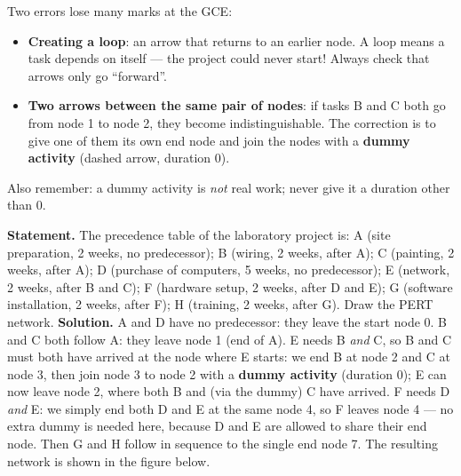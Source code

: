 \documentclass[11pt]{article}
\begin{document}
\begin{attention}
Two errors lose many marks at the GCE:
\begin{itemize}
\item \textbf{Creating a loop}: an arrow that returns to an earlier node. A loop means a task depends on itself --- the project could never start! Always check that arrows only go ``forward''.
\item \textbf{Two arrows between the same pair of nodes}: if tasks B and C both go from node 1 to node 2, they become indistinguishable. The correction is to give one of them its own end node and join the nodes with a \textbf{dummy activity} (dashed arrow, duration 0).
\end{itemize}
Also remember: a dummy activity is \emph{not} real work; never give it a duration other than 0.
\end{attention}

\begin{exoresolu}
\textbf{Statement.} The precedence table of the laboratory project is: A (site preparation, 2 weeks, no predecessor); B (wiring, 2 weeks, after A); C (painting, 2 weeks, after A); D (purchase of computers, 5 weeks, no predecessor); E (network, 2 weeks, after B and C); F (hardware setup, 2 weeks, after D and E); G (software installation, 2 weeks, after F); H (training, 2 weeks, after G). Draw the PERT network.
\tcblower
\textbf{Solution.} A and D have no predecessor: they leave the start node 0. B and C both follow A: they leave node 1 (end of A). E needs B \emph{and} C, so B and C must both have arrived at the node where E starts: we end B at node 2 and C at node 3, then join node 3 to node 2 with a \textbf{dummy activity} (duration 0); E can now leave node 2, where both B and (via the dummy) C have arrived. F needs D \emph{and} E: we simply end both D and E at the same node 4, so F leaves node 4 --- no extra dummy is needed here, because D and E are allowed to share their end node. Then G and H follow in sequence to the single end node 7. The resulting network is shown in the figure below.
\end{exoresolu}
\end{document}
